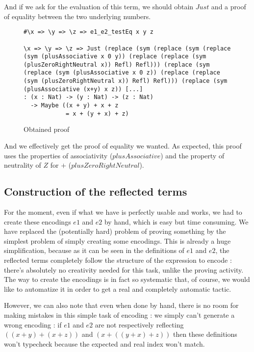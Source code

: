 And if we ask for the evaluation of this term, we should obtain $Just$ and a proof of equality between the two underlying numbers.

\begin{figure}[H]
\figrule
\begin{center}
\begin{lstlisting}
#\x => \y => \z => e1_e2_testEq x y z

\x => \y => \z => Just (replace (sym (replace (sym (replace 
(sym (plusAssociative x 0 y)) (replace (replace (sym 
(plusZeroRightNeutral x)) Refl) Refl))) (replace (sym 
(replace (sym (plusAssociative x 0 z)) (replace (replace 
(sym (plusZeroRightNeutral x)) Refl) Refl))) (replace (sym 
(plusAssociative (x+y) x z)) [...]
: (x : Nat) -> (y : Nat) -> (z : Nat) 
  -> Maybe ((x + y) + x + z 
            = x + (y + x) + z)
\end{lstlisting}
\end{center}
\caption{Obtained proof}
\label{obtainedProof}
\figrule
\end{figure}

And we effectively get the proof of equality we wanted. As expected, this proof uses the properties of associativity ($plusAssociative$) and the property of neutrality of $Z$ for $+$ ($plusZeroRightNeutral$).


\subsection{Construction of the reflected terms}
\label{sect:ReflectNat}

For the moment, even if what we have is perfectly usable and works, we had to create these encodings $e1$ and $e2$ by hand, which is easy but time consuming. We have replaced the (potentially hard) problem of proving something by the simplest problem of simply creating some encodings. This is already a huge simplification, because as it can be seen in the definitions of $e1$ and $e2$, the reflected terms completely follow the structure of the expression to encode : there's absolutely no creativity needed for this task, unlike the proving activity. The way to create the encodings is in fact so systematic that, of course, we would like to automatize it in order to get a real and completely automatic tactic.

However, we can also note that even when done by hand, there is no room for making mistakes in this simple task of encoding : we simply can't generate a wrong encoding : if $e1$ and $e2$ are not respectively reflecting $((x+y) + (x+z))$ and $(x + ((y + x) + z))$ then these definitions won't typecheck because the expected and real index won't match.

